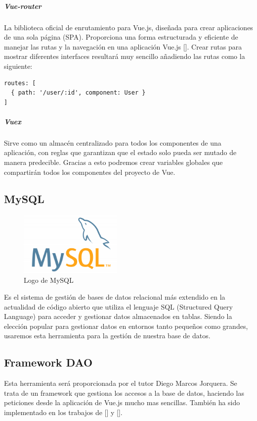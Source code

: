 \subparagraph{Vue-router}
La biblioteca oficial de enrutamiento para Vue.js, diseñada para crear aplicaciones de una sola página (SPA). Proporciona una forma estructurada y eficiente de manejar las rutas y la navegación en una aplicación Vue.js [\cite{vue_route}]. Crear rutas para mostrar diferentes interfaces resultará muy sencillo añadiendo las rutas como la siguiente:

\begin{lstlisting}[style=PHP-color, caption={Código para agregar un icono a la página},label=PHP-color_code]
routes: [
  { path: '/user/:id', component: User }
]
\end{lstlisting}

\subparagraph{Vuex}
Sirve como un almacén centralizado para todos los componentes de una aplicación, con reglas que garantizan que el estado solo pueda ser mutado de manera predecible. Gracias a esto podremos crear variables globales que compartirán todos los componentes del proyecto de Vue.

\subsection{MySQL}

\begin{figure}[H]
    \centering
    \includegraphics[width=5cm]{archivos/tfg_jorge/logos/mysql}
    \caption{Logo de MySQL}\label{sistemass2}
\end{figure}

Es el sistema de gestión de bases de datos relacional más extendido en la actualidad de código abierto que utiliza el lenguaje SQL (Structured Query Language) para acceder y gestionar datos almacenados en tablas. Siendo la elección popular para gestionar datos en entornos tanto pequeños como grandes, usaremos esta herramienta para la gestión de nuestra base de datos.

\subsection{Framework DAO}
Esta herramienta será proporcionada por el tutor Diego Marcos Jorquera. Se trata de un framework que gestiona los accesos a la base de datos, haciendo las peticiones desde la aplicación de Vue.js mucho mas sencillas. También ha sido implementado en los trabajos de [\cite{TFG_Sergio}] y [\cite{TFG_Daniel}].

